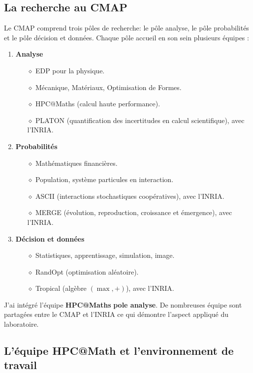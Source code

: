 \subsection{La recherche au CMAP}
Le CMAP comprend trois pôles  de recherche: le pôle analyse, le pôle probabilités et le pôle décision et données. Chaque pôle accueil en son sein plusieurs équipes :
\begin{enumerate}
    \item \textbf{Analyse}
        \begin{itemize}
            \item[$\diamond$] EDP pour la physique.
            \item[$\diamond$] Mécanique, Matériaux, Optimisation de Formes.
            \item[$\diamond$] HPC@Maths (calcul haute performance).
            \item[$\diamond$] PLATON (quantification des incertitudes en calcul scientifique), avec l'INRIA.
        \end{itemize}
    \item \textbf{Probabilités}
        \begin{itemize}
            \item[$\diamond$] Mathématiques financières.
            \item[$\diamond$] Population, système particules en interaction.
            \item[$\diamond$] ASCII (interactions stochastiques coopératives), avec l'INRIA.
            \item[$\diamond$] MERGE (évolution, reproduction, croissance et émergence), avec l'INRIA.
        \end{itemize}
    \item \textbf{Décision et données}
        \begin{itemize}
            \item[$\diamond$] Statistiques, apprentissage, simulation, image.
            \item[$\diamond$] RandOpt (optimisation aléatoire).
            \item[$\diamond$] Tropical (algèbre $(\max , +)$), avec l’INRIA.
        \end{itemize}
\end{enumerate}
J'ai intégré l'équipe \textbf{HPC@Maths} \textbf{pole analyse}.
De nombreuses équipe sont partagées entre le CMAP et l'INRIA ce qui démontre l'aspect appliqué du laboratoire.

\subsection{L'équipe HPC@Math et l’environnement de travail}
